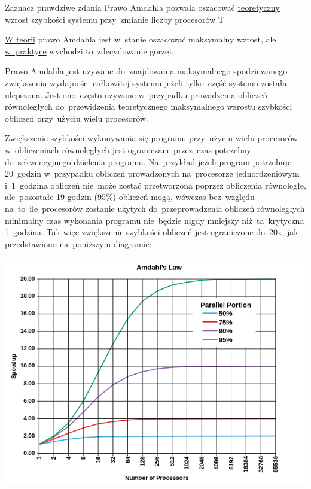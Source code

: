 \newpage

\answerC
{Zaznacz prawdziwe zdania}
{Prawo Amdahla pozwala oszacować \underline{teoretyczny} wzrost szybkości systemu przy~zmianie liczby procesorów}
{T}
{\underline{W teorii} prawo Amdahla jest w~stanie oszacować maksymalny wzrost, ale \underline{w~praktyce} wychodzi to~zdecydowanie gorzej.

\noindent
Prawo Amdahla jest używane do~znajdowania maksymalnego spodziewanego zwiększenia wydajności całkowitej systemu jeżeli tylko~część systemu została ulepszona. Jest ono~często używane w~przypadku prowadzenia obliczeń równoległych do~przewidzenia teoretycznego maksymalnego wzrostu szybkości obliczeń przy~użyciu wielu procesorów.

\noindent
Zwiększenie szybkości wykonywania się programu przy~użyciu wielu procesorów w~obliczeniach równoległych jest ograniczane przez~czas potrzebny do~sekwencyjnego dzielenia programu. Na~przykład jeżeli program potrzebuje 20~godzin w~przypadku obliczeń prowadzonych na~procesorze jednordzeniowym i~1~godzina obliczeń nie~może zostać przetworzona poprzez obliczenia równoległe, ale~pozostałe 19 godzin (95\%) obliczeń mogą, wówczas bez~względu na~to~ile~procesorów zostanie użytych do~przeprowadzenia obliczeń równoległych minimalny czas wykonania programu nie~będzie nigdy mniejszy niż~ta~krytyczna 1~godzina. Tak więc zwiększenie szybkości obliczeń jest ograniczone do~20x, jak przedstawiono na~poniższym diagramie:

\begin{center}
\includegraphics[width=14cm]{16/amdahl}
\end{center}}